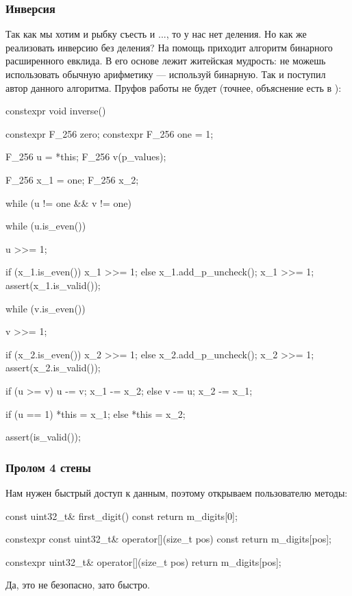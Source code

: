 \subsubsection{Инверсия}
Так как мы хотим и рыбку съесть и ..., то у нас нет деления. Но как же реализовать инверсию без деления? На помощь приходит алгоритм бинарного расширенного евклида. В его основе лежит житейская мудрость: не можешь использовать обычную арифметику --- используй бинарную. Так и поступил автор данного алгоритма. Пруфов работы не будет (точнее, объяснение есть в \cite{das2004guide}):
\begin{cppcode}
constexpr void inverse() {
    constexpr F_256 zero;
    constexpr F_256 one = 1;

    F_256 u = *this;
    F_256 v(p_values);

    F_256 x_1 = one;
    F_256 x_2;

    while (u != one && v != one) {
        while (u.is_even()) {
            u >>= 1;

            if (x_1.is_even()) {
                x_1 >>= 1;
            } else {
                x_1.add_p_uncheck();
                x_1 >>= 1;
                assert(x_1.is_valid());
            }
        }

        while (v.is_even()) {
            v >>= 1;

            if (x_2.is_even()) {
                x_2 >>= 1;
            } else {
                x_2.add_p_uncheck();
                x_2 >>= 1;
                assert(x_2.is_valid());
            }
        }

        if (u >= v) {
            u -= v;
            x_1 -= x_2;
        } else {
            v -= u;
            x_2 -= x_1;
        }
    }

    if (u == 1) {
        *this = x_1;
    } else {
        *this = x_2;
    }

    assert(is_valid());
}
\end{cppcode}
\subsubsection{Пролом 4 стены}
Нам нужен быстрый доступ к данным, поэтому открываем пользователю методы:
\begin{cppcode}
const uint32_t& first_digit() const {
    return m_digits[0];
}

constexpr const uint32_t& operator[](size_t pos) const {
    return m_digits[pos];
}

constexpr uint32_t& operator[](size_t pos) {
    return m_digits[pos];
}
\end{cppcode}
Да, это не безопасно, зато быстро.
